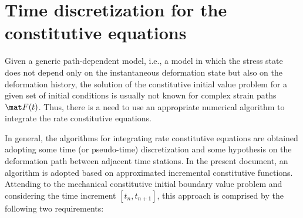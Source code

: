 \section{Time discretization for the constitutive equations} \label{sec:time_discretization}

Given a generic path-dependent model, i.e., a model in which the stress state does not depend only on the instantaneous deformation state but also on the deformation history, the solution of the constitutive initial value problem for a given set of initial conditions is usually not known for complex strain paths $\mat F(t)$.
Thus, there is a need to use an appropriate numerical algorithm to integrate the rate constitutive equations.

In general, the algorithms for integrating rate constitutive equations are obtained adopting some time (or pseudo-time) discretization and some hypothesis on the deformation path between adjacent time stations.
In the present document, an algorithm is adopted based on approximated incremental constitutive functions.
Attending to the mechanical constitutive initial boundary value problem and considering the time increment $[t_n, t_{n+1}]$, this approach is comprised by the following two requirements:

